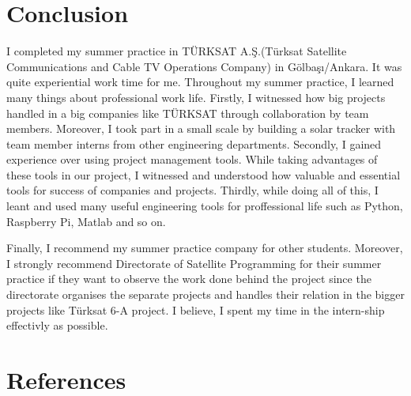 \vfill 

\section{Conclusion}

\-
\indent I completed my summer practice in TÜRKSAT A.Ş.(Türksat Satellite Communications and Cable TV Operations Company) in Gölbaşı/Ankara. It was quite experiential work time for me. Throughout my summer practice, I learned many things about professional work life. Firstly, I witnessed how big projects handled in a big companies like TÜRKSAT through collaboration by team members. Moreover, I took part in a small scale by building a solar tracker with team member interns from other engineering departments. Secondly, I gained experience over using project management tools. While taking advantages of these tools in our project, I witnessed and understood how valuable and essential tools for success of companies and projects. Thirdly, while doing all of this, I leant and used many useful engineering tools for proffessional life such as Python, Raspberry Pi, Matlab and so on. 
	
	Finally, I recommend my summer practice company for other students. Moreover, I strongly recommend Directorate of Satellite Programming for their summer practice if they want to observe the work done behind the project since the directorate organises the separate projects and handles their relation in the bigger projects like Türksat 6-A project. I believe, I spent my time in the intern-ship effectivly as possible.   

\vfill

\section{References}

